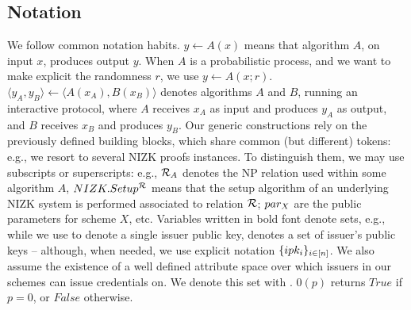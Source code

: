 \subsection{Notation}
\label{ssec:notation}

We follow common notation habits. $y \gets A(x)$ means that algorithm $A$, on
input $x$, produces output $y$. When $A$ is a probabilistic process, and we want
to make explicit the randomness $r$, we use $y \gets A(x;r)$. $\langle y_A,y_B
\rangle \gets \langle A(x_A),B(x_B)\rangle$ denotes algorithms $A$ and $B$,
running an interactive protocol, where $A$ receives $x_A$ as input and produces
$y_A$ as output, and $B$ receives $x_B$ and produces $y_B$.
%
Our generic constructions rely on the previously defined building blocks, which
share common (but different)
tokens: e.g., we resort to several NIZK proofs instances. To distinguish
them, we may use subscripts or superscripts: e.g., $\mathcal{R}_A$ denotes the
NP relation used within some algorithm $A$, $NIZK.Setup^{\mathcal{R}}$ means that
the setup algorithm of an underlying NIZK system is performed associated to
relation $\mathcal{R}$; $par_X$ are the public parameters for scheme $X$, etc.
Variables written in bold font denote sets, e.g., while we use \ipk to denote a
single issuer public key, \sipk denotes a set of issuer's public keys --
although, when needed, we use explicit notation $\lbrace ipk_i
\rbrace_{i\in[n]}$.
%
We also assume the existence of a well defined attribute space over which
issuers in our schemes can issue credentials on. We denote this set with
\AttrSpace.
%
$0(p)$ returns $True$ if $p=0$, or $False$ otherwise.

